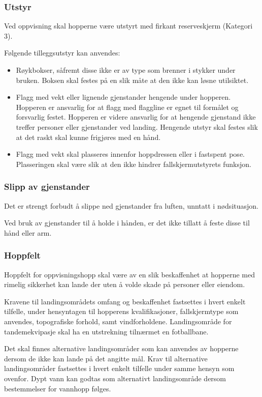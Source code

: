 \subsubsection{Utstyr}
Ved oppvisning skal hopperne være utstyrt med firkant reserveskjerm (Kategori 3).

Følgende tilleggsutstyr kan anvendes:
\begin{itemize}
	\item Røykbokser, såfremt disse ikke er av type som brenner i stykker under bruken. Boksen skal festes på en slik måte at den ikke kan løsne utilsiktet.
	\item Flagg med vekt eller lignende gjenstander hengende under hopperen. Hopperen er ansvarlig for at flagg med flaggline er egnet til formålet og forsvarlig festet. Hopperen er videre ansvarlig for at hengende gjenstand ikke treffer personer eller gjenstander ved landing. Hengende utstyr skal festes slik at det raskt skal kunne frigjøres med en hånd.
	\item Flagg med vekt skal plasseres innenfor hoppdressen eller i fastspent pose. Plasseringen skal være slik at den ikke hindrer fallskjermutstyrets funksjon.
\end{itemize}

\subsubsection{Slipp av gjenstander}
Det er strengt forbudt å slippe ned gjenstander fra luften, unntatt i nødsituasjon.

Ved bruk av gjenstander til å holde i hånden, er det ikke tillatt å feste disse til hånd eller arm.

\subsubsection{Hoppfelt}
Hoppfelt for oppvisningshopp skal være av en slik beskaffenhet at hopperne med rimelig sikkerhet kan lande der uten å volde skade på personer eller eiendom.

Kravene til landingsområdets omfang og beskaffenhet fastsettes i hvert enkelt tilfelle, under hensyntagen til hopperens kvalifikasjoner, fallskjermtype som anvendes, topografiske forhold, samt vindforholdene. Landingsområde for tandemekvipasje skal ha en utstrekning tilnærmet en fotballbane.

Det skal finnes alternative landingsområder som kan anvendes av hopperne dersom de ikke kan lande på det angitte mål. Krav til alternative landingsområder fastsettes i hvert enkelt tilfelle under samme hensyn som ovenfor. Dypt vann kan godtas som alternativt landingsområde dersom bestemmelser for vannhopp følges.

